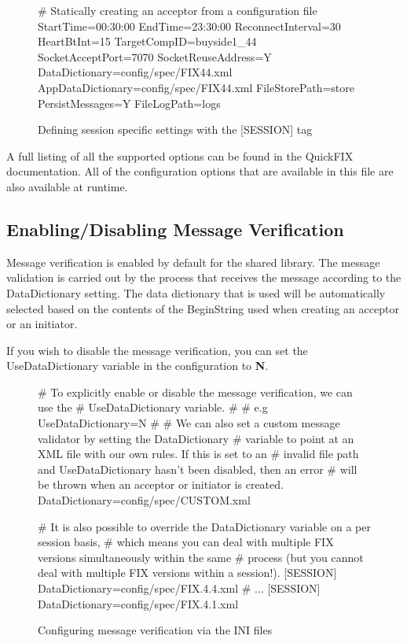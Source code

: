\begin{figure}[H]
\begin{inicode}
[SESSION]
# Statically creating an acceptor from a configuration file
StartTime=00:30:00
EndTime=23:30:00
ReconnectInterval=30
HeartBtInt=15
TargetCompID=buyside1_44
SocketAcceptPort=7070
SocketReuseAddress=Y
DataDictionary=config/spec/FIX44.xml
AppDataDictionary=config/spec/FIX44.xml
FileStorePath=store
PersistMessages=Y
FileLogPath=logs
\end{inicode}
\caption{Defining session specific settings with the [SESSION] tag}
\end{figure}

A full listing of all the supported options can be found in the QuickFIX documentation. All of the configuration options that are available in this file are also available at runtime.

\subsection{Enabling/Disabling Message Verification}

Message verification is enabled by default for the shared library. The message validation is carried out by the process that receives the message according to the DataDictionary setting. The data dictionary that is used will be automatically selected based on the contents of the BeginString
used when creating an acceptor or an initiator.

If you wish to disable the message verification, you can set the UseDataDictionary variable in the
configuration to \textbf{N}.

\begin{figure}[H]
\begin{inicode}
[DEFAULT]
# To explicitly enable or disable the message verification, we can use the
# UseDataDictionary variable.
#
# e.g UseDataDictionary=N
#
# We can also set a custom message validator by setting the DataDictionary
# variable to point at an XML file with our own rules. If this is set to an
# invalid file path and UseDataDictionary hasn't been disabled, then an error
# will be thrown when an acceptor or initiator is created.
DataDictionary=config/spec/CUSTOM.xml

# It is also possible to override the DataDictionary variable on a per session basis,
# which means you can deal with multiple FIX versions simultaneously within the same
# process (but you cannot deal with multiple FIX versions within a session!).
[SESSION]
DataDictionary=config/spec/FIX.4.4.xml
# ...
[SESSION]
DataDictionary=config/spec/FIX.4.1.xml

\end{inicode}
\caption{Configuring message verification via the INI files}
\end{figure}

